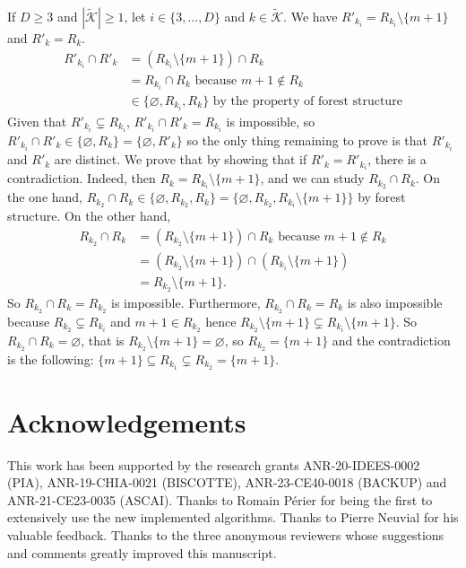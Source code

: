 \documentclass[
  11pt,
  a4paper,
]{article}
\theoremstyle{plain}
\theoremstyle{plain}
\theoremstyle{definition}
\theoremstyle{plain}
\theoremstyle{definition}
\theoremstyle{remark}
\begin{document}
If \(D\geq 3\) and \(|\widetilde{\mathcal{K}}|\geq1\), let
\(i\in\{3,\dotsc, D\}\) and \(k\in\widetilde{\mathcal{K}}\). We have
\(R'_{k_i}=R_{k_i}\setminus\{m+1\}\) and \(R'_k=R_k\). \begin{align*}
R'_{k_i}\cap R'_k&=(R_{k_i}\setminus\{m+1\})\cap R_k \\
&=R_{k_i}\cap R_k \text{ because } m+1\not\in R_k\\
&\in\{\varnothing, R_{k_i}, R_k\} \text{ by the property of forest structure}
\end{align*} Given that \(R'_{k_i}\subsetneq R_{k_i}\),
\(R'_{k_i}\cap R'_k=R_{k_i}\) is impossible, so
\(R'_{k_i}\cap R'_k\in\{\varnothing, R_k\}=\{\varnothing, R'_k\}\) so
the only thing remaining to prove is that \(R'_{k_i}\) and \(R'_k\) are
distinct. We prove that by showing that if \(R'_k = R'_{k_i}\), there is
a contradiction. Indeed, then \(R_k = R_{k_i}\setminus\{m+1\}\), and we
can study \(R_{k_2}\cap R_k\). On the one hand,
\(R_{k_2}\cap R_k\in\{\varnothing, R_{k_2}, R_k\}=\{\varnothing, R_{k_2}, R_{k_i}\setminus\{m+1\}\}\)
by forest structure. On the other hand, \begin{align*}
R_{k_2}\cap R_k&=(R_{k_2}\setminus\{m+1\})\cap R_k \text{ because }m+1\not\in R_k \\
&=(R_{k_2}\setminus\{m+1\})\cap (R_{k_i}\setminus\{m+1\})\\
&=R_{k_2}\setminus\{m+1\}.
\end{align*} So \(R_{k_2}\cap R_k=R_{k_2}\) is impossible. Furthermore,
\(R_{k_2}\cap R_k=R_{k}\) is also impossible because
\(R_{k_2}\subsetneq R_{k_i}\) and \(m+1\in R_{k_2}\) hence
\(R_{k_2}\setminus\{m+1\}\subsetneq R_{k_i}\setminus\{m+1\}\). So
\(R_{k_2}\cap R_k=\varnothing\), that is
\(R_{k_2}\setminus\{m+1\}=\varnothing\), so \(R_{k_2}=\{m+1\}\) and the
contradiction is the following:
\(\{m+1\}\subseteq R_{k_1}\subsetneq R_{k_2}=\{m+1\}\).

\section*{Acknowledgements}\label{acknowledgements}

This work has been supported by the research grants ANR-20-IDEES-0002
(PIA), ANR-19-CHIA-0021 (BISCOTTE), ANR-23-CE40-0018 (BACKUP) and
ANR-21-CE23-0035 (ASCAI). Thanks to Romain Périer for being the first to
extensively use the new implemented algorithms. Thanks to Pierre Neuvial
for his valuable feedback. Thanks to the three anonymous reviewers whose
suggestions and comments greatly improved this manuscript.
\end{document}

